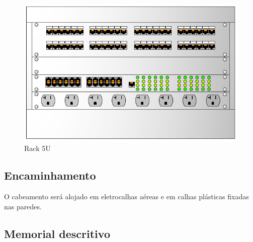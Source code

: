 \documentclass[	DIV=calc,%
							paper=a4,%
							fontsize=12pt,%
							onecolumn]{scrartcl}	 					%
\begin{document}
\begin{figure}[H]
	\centering
	\includegraphics[height=\textwidth,width=15cm,angle=0,keepaspectratio]{rack}
	\caption{Rack 5U}
	\label{RACK}	
\end{figure}




\subsection{Encaminhamento}
O cabeamento será alojado em eletrocalhas aéreas e em calhas plásticas fixadas nas paredes.


\subsection{Memorial descritivo}
\end{document}
